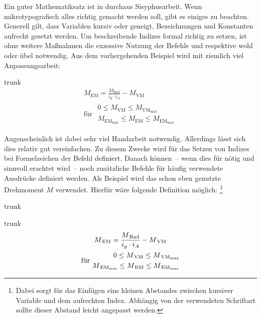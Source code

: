 \documentclass[%
  english,ngerman,%
  cdfont=false,%
  headings=small,%
]{tudscrartcl}
\begin{document}
Ein guter Mathematiksatz ist in  durchaus Sisyphusarbeit. Wenn 
mikrotypografisch alles richtig gemacht werden soll, gibt es einiges zu 
beachten. Generell gilt, dass Variablen kursiv oder geneigt, Bezeichnungen und 
Konstanten aufrecht gesetzt werden. Um beschreibende Indizes formal richtig zu 
setzen, ist ohne weitere Maßnahmen die exzessive Nutzung der Befehle 
 und  
respektive  wohl oder übel notwendig. 
Aus dem vorhergehenden Beispiel wird mit ziemlich viel Anpassungsarbeit:
%
\CodePreamble{}%
\begin{Code}[input]{trunk}
\begin{equation*}
\begin{gathered}
M_\mathrm{EM} = \frac{M_\mathrm{Rad}}{i_g \cdot i_A} - M_\mathrm{VM} \\
\textrm{für }
\begin{aligned}
0\leq M_\mathrm{VM}\leq M_\mathrm{VM_{max}} \\ 
M_\mathrm{EM_{min}}\leq M_\mathrm{EM}\leq M_\mathrm{EM_{max}}
\end{aligned}
\end{gathered}
\end{equation*}

\end{Code}

Augenscheinlich ist dabei sehr viel Handarbeit notwendig. Allerdings lässt sich 
dies relativ gut vereinfachen. Zu diesem Zwecke wird für das Setzen von Indizes 
bei Formelzeichen der Befehl  definiert. Danach 
können~-- wenn dies für nötig und sinnvoll erachtet wird~-- noch zusätzliche 
Befehle für häufig verwendete Ausdrücke definiert werden. Als Beispiel wird das 
schon eben genutzte Drehmoment \ensuremath{M} verwendet. Hierfür wäre folgende 
Definition möglich:%
\footnote{%
  Dabei sorgt  für das Einfügen eins kleinen Abstandes 
  zwischen kursiver Variable und dem aufrechten Index. Abhängig von der 
  verwendeten Schriftart sollte dieser Abstand leicht angepasst werden. 
}
%
\CodeHook{\let\newcommand\renewcommand}
\begin{Code}[input]{trunk}
\newcommand*\ind[1]{\ensuremath{\kern.03em_\mathrm{#1}}}
\newcommand*\M[1]{\ensuremath{M\ind{#1}}}

\end{Code}
\CodePreamble{}
\begin{Code}[input]{trunk}
\begin{equation*}
\begin{gathered}
\M{EM} = \frac{\M{Rad}}{i_g \cdot i_A} - \M{VM} \\
\textrm{für }
\begin{aligned}
0\leq \M{VM}\leq \M{VM_{max}} \\ 
\M{EM_{min}}\leq \M{EM}\leq \M{EM_{max}}
\end{aligned}
\end{gathered}
\end{equation*}

\end{Code}
\end{document}
